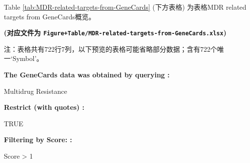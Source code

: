 \documentclass[
]{article}
\begin{document}
\begin{center}\vspace{1.5cm}\end{center}

Table \ref{tab:MDR-related-targets-from-GeneCards} (下方表格) 为表格MDR related targets from GeneCards概览。

\textbf{(对应文件为 \texttt{Figure+Table/MDR-related-targets-from-GeneCards.xlsx})}

\begin{center}\begin{tcolorbox}[colback=gray!10, colframe=gray!50, width=0.9\linewidth, arc=1mm, boxrule=0.5pt]注：表格共有722行7列，以下预览的表格可能省略部分数据；含有722个唯一`Symbol'。
\end{tcolorbox}
\end{center}\begin{center}\begin{tcolorbox}[colback=gray!10, colframe=gray!50, width=0.9\linewidth, arc=1mm, boxrule=0.5pt]
\textbf{
The GeneCards data was obtained by querying
:}

\vspace{0.5em}

    Multidrug Resistance

\vspace{2em}


\textbf{
Restrict (with quotes)
:}

\vspace{0.5em}

    TRUE

\vspace{2em}


\textbf{
Filtering by Score:
:}

\vspace{0.5em}

    Score > 1

\vspace{2em}
\end{tcolorbox}
\end{center}
\end{document}
